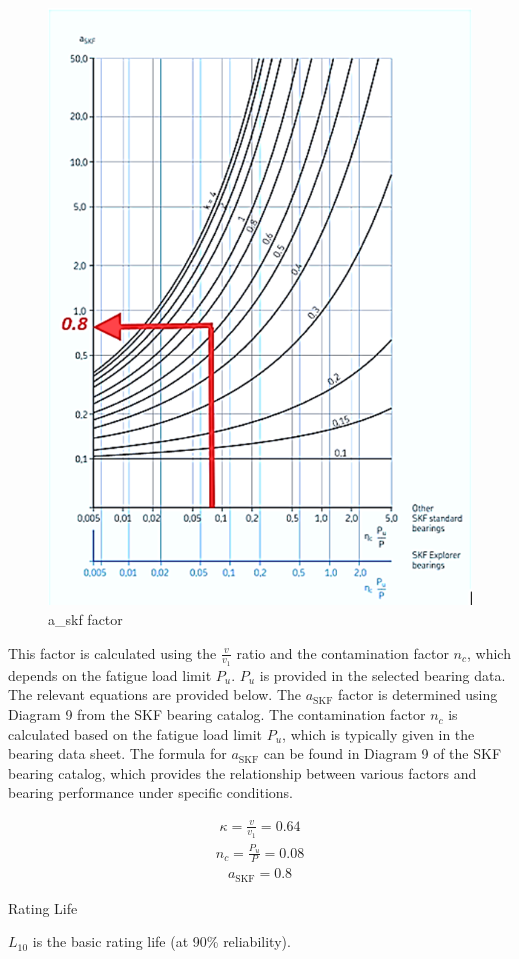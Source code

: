 \documentclass[12pt]{article}
\begin{document}
\begin{figure}[h!]
    \centering
    \includegraphics[width=0.6\linewidth]{a_skf.png}
    \caption{a\_skf factor}
    \label{fig:a_skf factor}
\end{figure}


This factor is calculated using the \( \frac{v}{v_1} \) ratio and the contamination factor \( n_c \), which depends on the fatigue load limit \( P_u \). \( P_u \) is provided in the selected bearing data. The relevant equations are provided below. The \( a_{\text{SKF}} \) factor is determined using Diagram 9 from the SKF bearing catalog. The contamination factor \( n_c \) is calculated based on the fatigue load limit \( P_u \), which is typically given in the bearing data sheet. The formula for \( a_{\text{SKF}} \) can be found in Diagram 9 of the SKF bearing catalog, which provides the relationship between various factors and bearing performance under specific conditions.

\begin{align}
\kappa = \frac{v}{v_1} = 0.64
\end{align}
\begin{align}
n_c = \frac{P_u}{P} = 0.08
\end{align}
\begin{align}
a_{\text{SKF}} = 0.8
\end{align}

Rating Life

\( L_{10} \) is the basic rating life (at 90\% reliability).
\end{document}
